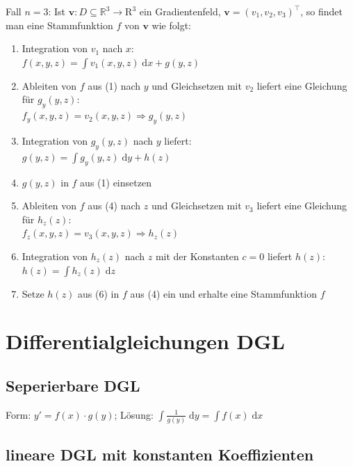 \documentclass[6pt,a4paper]{scrartcl}
\renewcommand{\vec}[1]{\ensuremath{\boldsymbol {#1}}}											%
\newcommand{\diff}{\ensuremath{\;\mathrm d}}									%
\begin{document}
\begin{multicols*}{4}
Fall $n=3$: Ist $\vec v:D\subseteq \mathbb{R}^3\rightarrow\mathrm{R}^3$ ein Gradientenfeld, $\vec v=(v_1,v_2,v_3)^\top$, so findet man eine Stammfunktion $f$ von $\vec v$ wie folgt:
\begin{enumerate}
	\item Integration von $v_1$ nach $x$:\\
	$f(x,y,z)=\int {v_1(x,y,z)\diff x} + g(y,z)$
	\item Ableiten von $f$ aus (1) nach $y$ und Gleichsetzen mit $v_2$ liefert eine Gleichung für $g_y(y,z)$:\\
	$f_y(x,y,z)=v_2(x,y,z) \Rightarrow g_y(y,z)$
	\item Integration von $g_y(y,z)$ nach $y$ liefert:\\
	$g(y,z) = \int{g_y(y,z)\diff y} + h(z)$
	\item $g(y,z)$ in $f$ aus (1) einsetzen
	\item Ableiten von $f$ aus (4) nach $z$ und Gleichsetzen mit $v_3$ liefert eine Gleichung für $h_z(z)$:\\
	$f_z(x,y,z)=v_3(x,y,z) \Rightarrow h_z(z)$
	\item Integration von $h_z(z)$ nach $z$ mit der Konstanten $c=0$ liefert $h(z)$: \\
	$h(z)=\int{h_z(z)\diff z}$
	\item Setze $h(z)$ aus (6) in $f$ aus (4) ein und erhalte eine Stammfunktion $f$
\end{enumerate}






\section{Differentialgleichungen DGL}



\subsection{Seperierbare DGL}
Form: $y' = f(x) \cdot g(y)$; Lösung: $\int \frac{1}{g(y)} \diff y = \int f(x) \diff x$



\subsection{lineare DGL mit konstanten Koeffizienten}


\end{multicols*}
\end{document}
